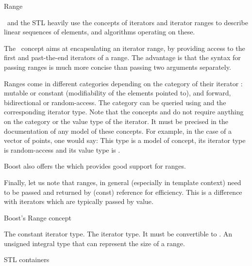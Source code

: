 \begin{ccRefConcept}{Range}

\ccDefinition

\cgal\ and the STL heavily use the concepts of iterators and iterator ranges
to describe linear sequences of elements, and algorithms operating on these.

The \ccRefName\ concept aims at encapsulating an iterator range, by providing
access to the first and past-the-end iterators of a range.  The advantage is
that the syntax for passing ranges is much more concise than passing two
arguments separately.


Ranges come in different categories depending on the category of their iterator :
mutable or constant (modifiability of the elements pointed to), and forward,
bidirectional or random-access.  The category can be queried using
 and the corresponding iterator type.  Note that
the concepts  and  do not require anything on
the category or the value type of the iterator. It must be precised in the
documentation of any model of these concepts. For example, in the case of a vector of points, one would say:
This type is a model of  concept, its iterator type is random-access
and its value type is .

Boost also offers the
which provides good support for ranges.

Finally, let us note that ranges, in general (especially in template context)
need to be passed and returned by (const) reference for efficiency.  This is a
difference with iterators which are typically passed by value.

\ccRefines


Boost's Range concept

{}  %

\ccTypes

 {The constant iterator type.}
 {The iterator type.  It must be convertible to .}
 {An unsigned integral type that can represent the
  size of a range.} 


\def\ccTagRmTrailingConst{\ccFalse}

\ccGlue
{}
\ccGlue
{}
\ccGlue
{}

\ccGlue
{}

\def\ccTagRmTrailingConst{\ccTrue}

\ccHasModels
STL containers\\

\end{ccRefConcept}
